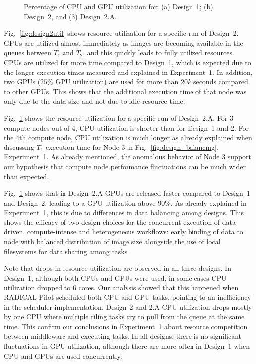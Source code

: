 \begin{figure}[H]
\begin{subfigure}[b]{0.75\textwidth}
        \caption{}
        \label{fig:design2autil}
    \end{subfigure}
    \caption{Percentage of CPU and GPU utilization for: (a) Design~1; (b)
        Design~2, and (3) Design~2.A.}
    \label{fig:Utilization}
\end{figure}


Fig.~\ref{fig:design2util} shows resource utilization for a specific run of Design~2.
GPUs are utilized almost immediately as images are becoming available in the queues between $T_{1}$ and $T_{2}$, and this quickly leads to fully utilized resources.
CPUs are utilized for more time compared to Design~1, which is expected due to the longer execution times measured and explained in Experiment~1.
In addition, two GPUs ($25\%$ GPU utilization) are used for more than $20k$ seconds compared to other GPUs.
This shows that the additional execution time of that node was only due to the data size and not due to idle resource time.

Fig.~\ref{fig:design2autil} shows the resource utilization for a specific run of Design~2.A.
For 3 compute nodes out of 4, CPU utilization is shorter than for Design~1 and 2.
For the 4th compute node, CPU utilization is much longer as already explained when discussing $T_{1}$ execution time for Node 3 in Fig.~\ref{fig:design_balancing}, Experiment~1.
As already mentioned, the anomalous behavior of Node 3 support our hypothesis that compute node performance fluctuations can be much wider than expected.

Fig.~\ref{fig:design2autil} shows that in Design~2.A GPUs are released faster compared to Design~1 and Design~2, leading to a GPU utilization above $90\%$.
As already explained in Experiment~1, this is due to differences in data balancing among designs.
This shows the efficacy of two design choices for the concurrent execution of data-driven, compute-intense and heterogeneous workflows: early binding of data to node with balanced distribution of image size alongside the use of local filesystems for data sharing among tasks.

Note that drops in resource utilization are observed in all three designs.
In Design~1, although both CPUs and GPUs were used, in some cases CPU utilization dropped to 6 cores.
Our analysis showed that this happened when RADICAL-Pilot scheduled both CPU and GPU tasks, pointing to an inefficiency in the scheduler implementation.
Design~2 and 2.A CPU utilization drops mostly by one CPU where multiple tiling tasks try to pull from the queue at the same time.
This confirm our conclusions in Experiment~1 about resource competition between middleware and executing tasks.
In all designs, there is no significant fluctuations in GPU utilization, although there are more often in Design~1 when CPU and GPUs are used concurrently.

